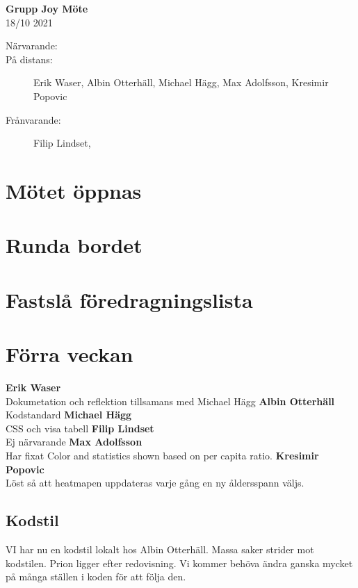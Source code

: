 \documentclass[9pt]{article}
\newcommand{\Waser}{Erik Waser\xspace}
\newcommand{\Slaget}{Albin Otterhäll\xspace}
\newcommand{\Max}{Max Adolfsson\xspace}
\newcommand{\Kim}{Michael Hägg\xspace}
\newcommand{\Algen}{Filip Lindset\xspace}
\newcommand{\Kres}{Kresimir Popovic\xspace}
\newcommand{\datum}{18/10 2021} %
\begin{document}
\begin{center}
    \Large{\textbf{Grupp Joy Möte}}\\
    \normalsize
    \datum \\ %
\end{center}

\begin{description} %
  \item [Närvarande:] 
  \item [På distans:] \Waser, \Slaget, \Kim, \Max, \Kres
  \item [Frånvarande:] \Algen, 

\end{description}

\section{Mötet öppnas}

\section{Runda bordet}

\section{Fastslå föredragningslista}

\section{Förra veckan}
\textbf{\Waser}\\ Dokumetation och reflektion tillsamans med \Kim
\textbf{\Slaget}\\ Kodstandard
\textbf{\Kim}\\ CSS och visa tabell
\textbf{\Algen}\\ Ej närvarande
\textbf{\Max}\\ Har fixat Color and statistics shown based on per capita ratio. 
\textbf{\Kres}\\ Löst så att heatmapen uppdateras varje gång en ny åldersspann väljs. 

\subsection{Kodstil}
VI har nu en kodstil lokalt hos \Slaget. Massa saker strider mot kodstilen. Prion ligger efter redovisning. Vi kommer behöva ändra ganska mycket på många ställen i koden för att följa den. 
\end{document}
